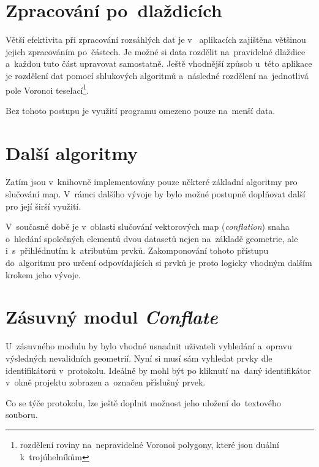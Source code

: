 







\section{Zpracování po~dlaždicích}
\label{dlazdice-vyvoj}

Větší efektivita při zpracování rozsáhlých dat je v~ 
aplikacích zajištěna většinou jejich zpracováním po~částech. Je možné
si data rozdělit na~pravidelné dlaždice a~každou tuto část upravovat
samostatně. Ještě vhodnější způsob u~této aplikace je %
rozdělení dat pomocí shlukových algoritmů a~následné rozdělení
na~jednotlivá pole Voronoi teselací\footnote{rozdělení roviny 
na~nepravidelné Voronoi polygony, které jsou duální k~trojúhelníkům
}.

Bez tohoto postupu je využití programu omezeno pouze na~menší data.


\section{Další algoritmy}
\label{dalsi-vyvoj}

Zatím jsou v~knihovně  implementovány pouze některé
základní algoritmy pro slučování map. V~rámci dalšího vývoje by
bylo možné postupně doplňovat další pro její širší využití.

V~současné době je v~oblasti slučování vektorových map 
(\textit{conflation}) snaha o~hledání společných elementů 
dvou datasetů nejen na~základě geometrie, ale i~s~přihlédnutím
k~atributům prvků. Zakomponování tohoto přístupu do~algoritmu 
pro určení odpovídajících si prvků je proto logicky vhodným 
dalším krokem jeho vývoje.


\section{Zásuvný modul \textit{Conflate}}

U~zásuvného modulu by bylo vhodné usnadnit uživateli vyhledání
a~opravu výsledných nevalidních geometrií. Nyní si musí sám
vyhledat prvky dle identifikátorů v~protokolu. Ideálně by
mohl být po kliknutí na~daný identifikátor v~okně projektu zobrazen
a~označen příslušný prvek.

Co se týče protokolu, lze ještě doplnit možnost jeho uložení
do~textového souboru.
